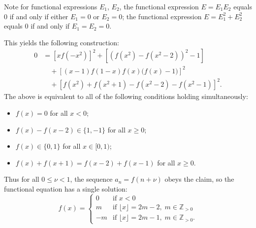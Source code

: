 Note for functional expressions $E_1$, $E_2$, the functional expression $E=E_1E_2$ equals $0$ if and only if either $E_1=0$ or $E_2=0$; the functional expression $E=E_1^2+E_2^2$ equals $0$ if and only if $E_1=E_2=0$.

This yields the following construction:
\begin{align*}
    0&=\left[xf\left(-x^2\right)\right]^2+\left[\left(f\left(x^2\right)-f\left(x^2-2\right)\right)^2-1\right]\\
    &\quad+\left[(x-1)f(1-x)f(x)\big(f(x)-1\big)\right]^2\\
    &\quad+\left[f\left(x^2\right)+f\left(x^2+1\right)-f\left(x^2-2\right)-f\left(x^2-1\right)\right]^2.
\end{align*}
The above is equivalent to all of the following conditions holding simultaneously:
\begin{itemize}[itemsep=0em]
    \item $f(x)=0$ for all $x<0$;
    \item $f(x)-f(x-2)\in\{1,-1\}$ for all $x\ge0$;
    \item $f(x)\in\{0,1\}$ for all $x\in[0,1)$;
    \item $f(x)+f(x+1)=f(x-2)+f(x-1)$ for all $x\ge0$.
\end{itemize}
Thus for all $0\le\nu<1$, the sequence $a_n=f(n+\nu)$ obeys the claim, so the functional equation has a single solution: \[f(x)=\begin{cases}
        0&\text{if }x<0\\
        m&\text{if }\lfloor x\rfloor=2m-2,\;m\in\mathbb Z_{>0}\\
        -m&\text{if }\lfloor x\rfloor=2m-1,\;m\in\mathbb Z_{>0}.
\end{cases}\]

